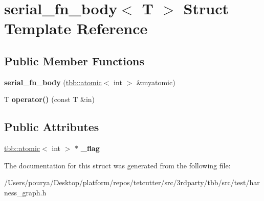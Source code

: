 \hypertarget{structserial__fn__body}{}\section{serial\+\_\+fn\+\_\+body$<$ T $>$ Struct Template Reference}
\label{structserial__fn__body}
\subsection*{Public Member Functions}
\begin{DoxyCompactItemize}
\item 
\hypertarget{structserial__fn__body_a8075578b94eea06e80b99341792c30de}{}{\bfseries serial\+\_\+fn\+\_\+body} (\hyperlink{structtbb_1_1atomic}{tbb\+::atomic}$<$ int $>$ \&myatomic)\label{structserial__fn__body_a8075578b94eea06e80b99341792c30de}

\item 
\hypertarget{structserial__fn__body_aca95c7145ebb7382ef13521c1b3b6bd3}{}T {\bfseries operator()} (const T \&in)\label{structserial__fn__body_aca95c7145ebb7382ef13521c1b3b6bd3}

\end{DoxyCompactItemize}
\subsection*{Public Attributes}
\begin{DoxyCompactItemize}
\item 
\hypertarget{structserial__fn__body_a36c7843424d4a351cb536cad8a7ac2b6}{}\hyperlink{structtbb_1_1atomic}{tbb\+::atomic}$<$ int $>$ $\ast$ {\bfseries \+\_\+flag}\label{structserial__fn__body_a36c7843424d4a351cb536cad8a7ac2b6}

\end{DoxyCompactItemize}


The documentation for this struct was generated from the following file\+:\begin{DoxyCompactItemize}
\item 
/\+Users/pourya/\+Desktop/platform/repos/tetcutter/src/3rdparty/tbb/src/test/harness\+\_\+graph.\+h\end{DoxyCompactItemize}
